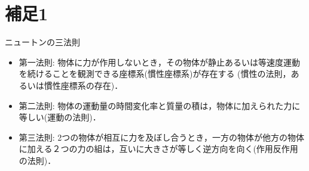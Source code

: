 \documentclass[11pt,a4j]{mybook2}
\begin{document}
\section{補足1}
ニュートンの三法則
\begin{itemize}
\item
第一法則:
物体に力が作用しないとき，その物体が静止あるいは等速度運動を続けることを観測できる座標系(慣性座標系)が存在する
		(慣性の法則，あるいは慣性座標系の存在)．
\item
第二法則:
物体の運動量の時間変化率と質量の積は，物体に加えられた力に等しい(運動の法則)．
\item
第三法則:
2つの物体が相互に力を及ぼし合うとき，一方の物体が他方の物体に加える２つの力の組は，互いに大きさが等しく逆方向を向く(作用反作用の法則)．
\end{itemize}
\end{document}
